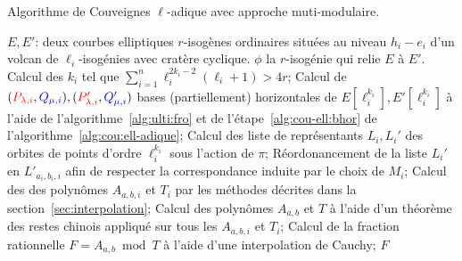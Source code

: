\documentclass[10pt,a4paper]{book}
\theoremstyle{plain}
\theoremstyle{definition}
\theoremstyle{definition}
\theoremstyle{definition}
\theoremstyle{definition}
\theoremstyle{remark}
\theoremstyle{remark}
\theoremstyle{definition}
\begin{document}
\begin{algorithm}
\caption{\label{alg:cou:mult-adique:short} Algorithme de Couveignes $\ell$-adique avec approche muti-modulaire.}
\begin{algorithmic}[1]
\REQUIRE $E,E'$: deux courbes elliptiques $r$-isogènes ordinaires situées au niveau $h_i-e_i$ d'un volcan de $\ell_i$-isogénies avec cratère cyclique.
\ENSURE $\phi$ la $r$-isogénie qui relie $E$ à $E'$.
\STATE Calcul des $k_i$ tel que $\sum_{i=1}^n\ell_{i}^{2k_{i}-2}(\ell_{i}+1)>4r$;
\STATE \label{alg:mult-ell:bhor} Calcul de $(\color{red}P_{\lambda,i}\color{black},\color{blue}Q_{\mu,i}\color{black}),(\color{red}P'_{\lambda,i}\color{black},\color{blue}Q_{\mu,i}'\color{black})$ bases (partiellement) horizontales de $E[\ell_i^{k_i}],E'[\ell_i^{k_i}]$ à l'aide de l'algorithme~\ref{alg:ulti:fro} et de l'étape~\ref{alg:cou-ell:bhor} de l'algorithme~\ref{alg:cou:ell-adique};
\STATE \label{alg:mult-ell:rep} Calcul des liste de représentants $L_i,L_i'$ des orbites de points d'ordre $\ell_i^{k_i}$ sous l'action de $\pi$;
\ENDFOR
{}
\STATE \label{alg:mult-ell:ord} Réordonancement de la liste $L_i'$ en $L'_{a_i,b_i,i}$ afin de respecter la correspondance induite par le choix de $M_i$;
\STATE \label{alg:mult-ell:int} Calcul des des polynômes $A_{a,b,i}$ et $T_i$ par les méthodes décrites dans la section~\ref{sec:interpolation};
\ENDFOR
\STATE Calcul des polynômes $A_{a,b}$ et $T$ à l'aide d'un théorème des restes chinois appliqué sur tous les $A_{a,b,i}$ et $T_i$;
\STATE \label{alg:mult-ell:Cauchy} Calcul de la fraction rationnelle $F=A_{a,b} \bmod T$ à l'aide d'une interpolation de Cauchy;
\RETURN $F$
\ENDIF
\ENDFOR 
\end{algorithmic}
\end{algorithm}
\end{document}
